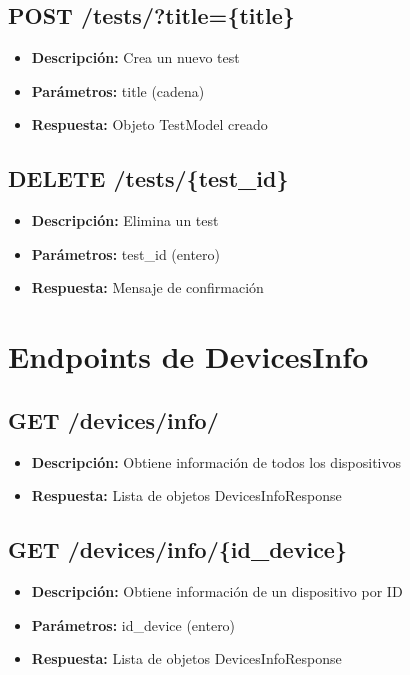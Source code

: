 \documentclass[12pt,letterpaper]{report}
\begin{document}
\subsection{POST /tests/?title=\{title\}}
\begin{itemize}
    \item \textbf{Descripción:} Crea un nuevo test
    \item \textbf{Parámetros:} title (cadena)
    \item \textbf{Respuesta:} Objeto TestModel creado
\end{itemize}

\subsection{DELETE /tests/\{test\_id\}}
\begin{itemize}
    \item \textbf{Descripción:} Elimina un test
    \item \textbf{Parámetros:} test\_id (entero)
    \item \textbf{Respuesta:} Mensaje de confirmación
\end{itemize}

\section{Endpoints de DevicesInfo}
\subsection{GET /devices/info/}
\begin{itemize}
    \item \textbf{Descripción:} Obtiene información de todos los dispositivos
    \item \textbf{Respuesta:} Lista de objetos DevicesInfoResponse
\end{itemize}

\subsection{GET /devices/info/\{id\_device\}}
\begin{itemize}
    \item \textbf{Descripción:} Obtiene información de un dispositivo por ID
    \item \textbf{Parámetros:} id\_device (entero)
    \item \textbf{Respuesta:} Lista de objetos DevicesInfoResponse
\end{itemize}
\end{document}
